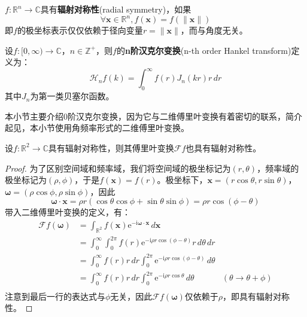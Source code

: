 \begin{definition}[辐射对称性]
    $f:\mathbb{R}^n\to\mathbb{C}$具有\textbf{辐射对称性}(radial symmetry)，如果
    $$\forall\mathbf{x}\in\mathbb{R}^n,f(\mathbf{x})=f(\|\mathbf{x}\|)$$
    即$f$的极坐标表示仅仅依赖于径向变量$r=\|\mathbf{x}\|$，而与角度无关。
\end{definition}

\begin{definition}[汉克尔变换]
    设$f:[0,\infty)\to\mathbb{C}$，$n\in\mathbb{Z}^+$，则$f$的\textbf{n阶汉克尔变换}(n-th order Hankel transform)定义为：
    \[\mathcal{H} _n f(k)=\int_0^{\infty}f(r)J_n(kr)r\,dr\]
    其中$J_n$为第一类贝塞尔函数。
\end{definition}

本小节主要介绍0阶汉克尔变换，因为它与二维傅里叶变换有着密切的联系，简介起见，本小节使用角频率形式的二维傅里叶变换。

\begin{lemma}
    设$f:\mathbb{R}^2\to\mathbb{C}$具有辐射对称性，则其傅里叶变换$\mathcal{F} f$也具有辐射对称性。
\end{lemma}
\begin{proof}
    为了区别空间域和频率域，我们将空间域的极坐标记为$(r,\theta)$，频率域的极坐标记为$(\rho,\phi)$，于是$f(\mathbf{x})=f(r)$。极坐标下，$\mathbf{x}=(r\cos\theta,r\sin\theta)$，$\boldsymbol{\omega}=(\rho\cos\phi,\rho\sin\phi)$，因此
    $$\boldsymbol{\omega}\cdot\mathbf{x}=\rho r(\cos\theta\cos\phi+\sin\theta\sin\phi)=\rho r \cos(\phi-\theta)$$
    带入二维傅里叶变换的定义，有：
    \begin{align*}
        \mathcal{F} f(\boldsymbol{\omega})&=\int_{\mathbb{R}^2}f(\mathbf{x})\mathrm{e}^{-\mathrm{i}\boldsymbol{\omega}\cdot\mathbf{x}}\,d\mathbf{x}\\
        &=\int_0^{\infty}\int_0^{2\pi}f(r)\mathrm{e}^{-\mathrm{i} \rho r \cos(\phi-\theta)}r\,d\theta\,dr\\
        &=\int_0^{\infty}f(r)r\,dr\int_0^{2\pi}\mathrm{e}^{-\mathrm{i} \rho r \cos(\phi-\theta)}\,d\theta\\
        &=\int_0^{\infty}f(r)r\,dr\int_0^{2\pi}\mathrm{e}^{-\mathrm{i} \rho r \cos\theta}\,d\theta&(\theta\to \theta+\phi)\\
    \end{align*}
    注意到最后一行的表达式与$\phi$无关，因此$\mathcal{F} f(\boldsymbol{\omega})$仅依赖于$\rho$，即具有辐射对称性。
\end{proof}

